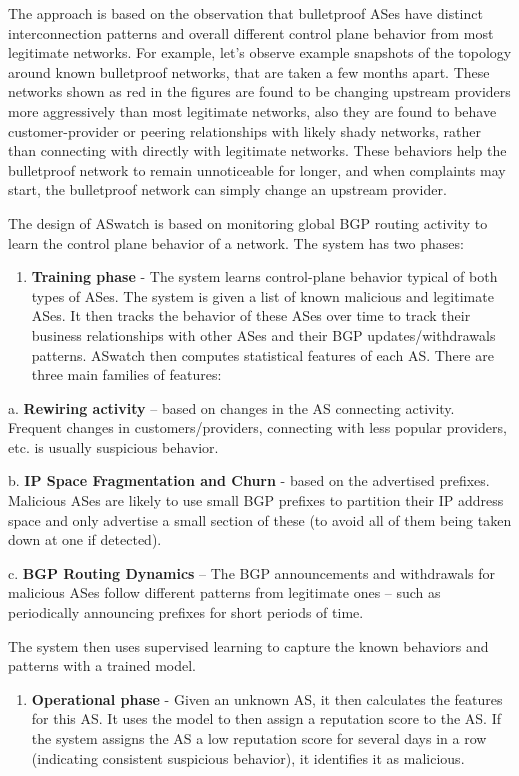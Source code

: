 \documentclass[11pt]{article}
\begin{document}
The approach is based on the observation that bulletproof ASes have distinct interconnection patterns and overall different control plane behavior from most legitimate networks. For example, let's observe example snapshots of the topology around known bulletproof networks, that are taken a few months apart. These networks shown as red in the figures are found to be changing upstream providers more aggressively than most legitimate networks, also they are found to behave customer-provider or peering relationships with likely shady networks, rather than connecting with directly with legitimate networks. These behaviors help the bulletproof network to remain unnoticeable for longer, and when complaints may start, the bulletproof network can simply change an upstream provider.

The design of ASwatch is based on monitoring global BGP routing activity to learn the control plane behavior of a network. The system has two phases:

\begin{enumerate}
\item \textbf{Training phase} - The system learns control-plane behavior typical of both types of ASes. The system is given a list of known malicious and legitimate ASes. It then tracks the behavior of these ASes over time to track their business relationships with other ASes and their BGP updates/withdrawals patterns.  ASwatch then computes statistical features of each AS. There are three main families of features:
\end{enumerate}

a. \textbf{Rewiring activity} – based on changes in the AS connecting activity. Frequent changes in customers/providers, connecting with less popular providers, etc. is usually suspicious behavior.

b. \textbf{IP Space Fragmentation and Churn} - based on the advertised prefixes. Malicious ASes are likely to use small BGP prefixes to partition their IP address space and only advertise a small section of these (to avoid all of them being taken down at one if detected).

c. \textbf{BGP Routing Dynamics} – The BGP announcements and withdrawals for malicious ASes follow different patterns from legitimate ones – such as periodically announcing prefixes for short periods of time.

The system then uses supervised learning to capture the known behaviors and patterns with a trained model.   

\begin{enumerate}
\item \textbf{Operational phase} - Given an unknown AS, it then calculates the features for this AS. It uses the model to then assign a reputation score to the AS. If the system assigns the AS a low reputation score for several days in a row (indicating consistent suspicious behavior), it identifies it as malicious.
\end{enumerate}
\end{document}
